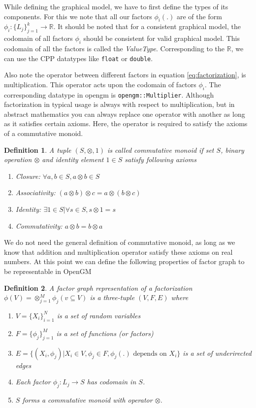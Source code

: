 \documentclass[12pt,oneside,letterpaper]{article}
\newtheorem{definition}{Definition}
\begin{document}
While defining the graphical model, we have to first define the types of its
components. For this we note that all our factors $\phi_i(.)$ are of the form
$\phi_i : \{L_j\}_{j=1}^{k} \rightarrow \mathbb{R}$. It should be noted that
for a consistent graphical model, the codomain of all factors $\phi_i$ should
be consistent for valid graphical model. This codomain of all the factors is called
the \emph{ValueType}. Corresponding to the $\mathbb{R}$, we can use the CPP
datatypes like \lstinline|float| or \lstinline|double|.

Also note the operator between different factors in equation
\eqref{eq:factorization}, is multiplication. This operator acts upon the
codomain of factors $\phi_i$. The corresponding datatype in opengm is
\lstinline|opengm::Multiplier|.  Although factorization in typical usage is
always with respect to multiplication, but in abstract mathematics you can
always replace one operator with another as long as it satisfies certain
axioms. Here, the operator is required to satisfy the axioms of a commutative
monoid.

\begin{definition}
  A tuple $(S, \otimes, 1)$ is called commutative monoid if set $S$, binary operation $\otimes$ and identity element $1 \in S$ satisfy following axioms
  \begin{enumerate}
    \item Closure: $\forall a, b \in S, a \otimes b \in S$
    \item Associativity: $(a \otimes b) \otimes  c = a \otimes (b \otimes  c)$
    \item Identity: $\exists 1 \in S | \forall s \in S, s \otimes 1 = s$
    \item Commutativity: $a\otimes b = b\otimes a$
  \end{enumerate}
\end{definition}

We do not need the general definition of commutative monoid, as long as we know
that addition and multiplication operator satisfy these axioms on real numbers.
At this point we can define the following properties of factor graph to be
representable in OpenGM

\begin{definition}
A \emph{factor graph} representation of a factorization 
$\phi(V) = \otimes_{j=1}^M \phi_j(v \subseteq V)$ 
is a three-tuple $(V, F, E)$ where 
\begin{enumerate}
   \item $V = \{X_i\}_{i=1}^{N}$ is a set of random variables 
   \item $F = \{\phi_j\}_{j=1}^{M}$ is a set of functions (or factors)
   \item $E = \{(X_i, \phi_j) | X_i \in V, \phi_j \in F, \phi_j(.) \text{ depends on } X_i\}$ is a set of underirected edges
   \item Each factor $\phi_j : L_j \rightarrow S$ has codomain in $S$.
   \item $S$ forms a commutative monoid with operator $\otimes$.
\end{enumerate}
\end{definition}
\end{document}
